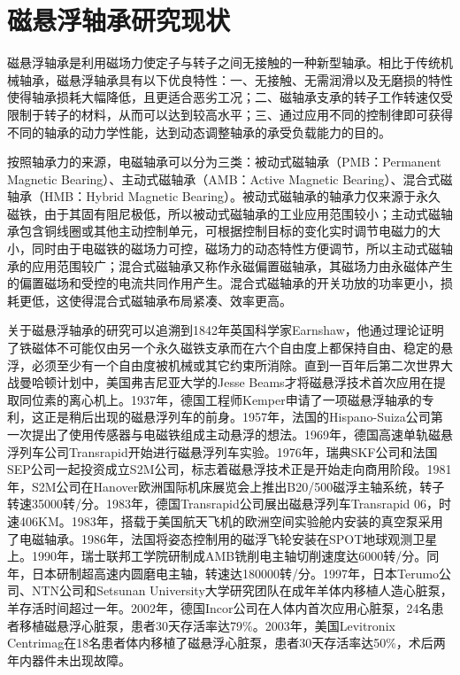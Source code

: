 \section{磁悬浮轴承研究现状}
磁悬浮轴承是利用磁场力使定子与转子之间无接触的一种新型轴承。相比于传统机械轴承，磁悬浮轴承具有以下优良特性：一、无接触、无需润滑以及无磨损的特性使得轴承损耗大幅降低，且更适合恶劣工况；二、磁轴承支承的转子工作转速仅受限制于转子的材料，从而可以达到较高水平；三、通过应用不同的控制律即可获得不同的轴承的动力学性能，达到动态调整轴承的承受负载能力的目的。

按照轴承力的来源，电磁轴承可以分为三类：被动式磁轴承（PMB：Permanent Magnetic Bearing）、主动式磁轴承（AMB：Active Magnetic Bearing）、混合式磁轴承（HMB：Hybrid Magnetic Bearing）。被动式磁轴承的轴承力仅来源于永久磁铁，由于其固有阻尼极低，所以被动式磁轴承的工业应用范围较小；主动式磁轴承包含铜线圈或其他主动控制单元，可根据控制目标的变化实时调节电磁力的大小，同时由于电磁铁的磁场力可控，磁场力的动态特性方便调节，所以主动式磁轴承的应用范围较广；混合式磁轴承又称作永磁偏置磁轴承，其磁场力由永磁体产生的偏置磁场和受控的电流共同作用产生。混合式磁轴承的开关功放的功率更小，损耗更低，这使得混合式磁轴承布局紧凑、效率更高。

关于磁悬浮轴承的研究可以追溯到1842年英国科学家Earnshaw，他通过理论证明了铁磁体不可能仅由另一个永久磁铁支承而在六个自由度上都保持自由、稳定的悬浮，必须至少有一个自由度被机械或其它约束所消除\cite{earnshaw1842nature}。直到一百年后第二次世界大战曼哈顿计划中，美国弗吉尼亚大学的Jesse Beams才将磁悬浮技术首次应用在提取同位素的离心机上。1937年，德国工程师Kemper申请了一项磁悬浮轴承的专利\cite{kemper1937schwebebahn}，这正是稍后出现的磁悬浮列车的前身。1957年，法国的Hispano-Suiza公司第一次提出了使用传感器与电磁铁组成主动悬浮的想法\cite{patent19571186527}。1969年，德国高速单轨磁悬浮列车公司Transrapid开始进行磁悬浮列车实验。1976年，瑞典SKF公司和法国SEP公司一起投资成立S2M公司，标志着磁悬浮技术正是开始走向商用阶段。1981年，S2M公司在Hanover欧洲国际机床展览会上推出B20/500磁浮主轴系统，转子转速35000转/分。1983年，德国Transrapid公司展出磁悬浮列车Transrapid 06，时速406KM。1983年，搭载于美国航天飞机的欧洲空间实验舱内安装的真空泵采用了电磁轴承。1986年，法国将姿态控制用的磁浮飞轮安装在SPOT地球观测卫星上。1990年，瑞士联邦工学院研制成AMB铣削电主轴切削速度达6000转/分\cite{siegwart1990design}。同年，日本研制超高速内圆磨电主轴，转速达180000转/分\cite{ota1990monitoring}。1997年，日本Terumo公司、NTN公司和Setsunan University大学研究团队在成年羊体内移植人造心脏泵，羊存活时间超过一年\cite{nojiri1997more}。2002年，德国Incor公司在人体内首次应用心脏泵，24名患者移植磁悬浮心脏泵，患者30天存活率达79\%\cite{hetzer2004first}。2003年，美国Levitronix Centrimag在18名患者体内移植了磁悬浮心脏泵，患者30天存活率达50\%，术后两年内器件未出现故障\cite{de2006clinical}。

